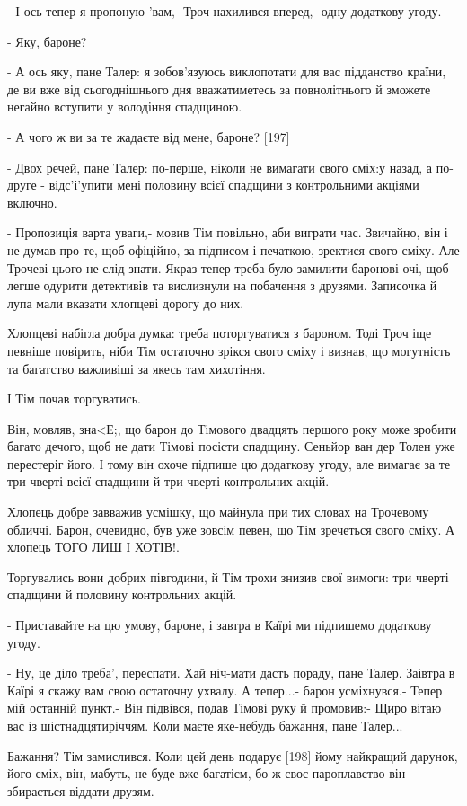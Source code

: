 - І ось тепер я пропоную 'вам,- Троч нахилився вперед,- одну додаткову угоду.

- Яку, бароне?

- А ось яку, пане Талер: я зобов'язуюсь виклопотати для вас підданство країни, де ви вже від сьогоднішнього дня вважатиметесь за повнолітнього й зможете негайно вступити у володіння спадщиною.

- А чого ж ви за те жадаєте від мене, бароне? [197]

- Двох речей, пане Талер: по-перше, ніколи не вимагати свого сміх:у назад, а по-друге - відс'і'упити мені половину всієї спадщини з контрольними акціями включно.

- Пропозиція варта уваги,- мовив Тім повільно, аби виграти час. Звичайно, він і не думав про те, щоб офіційно, за підписом і печаткою, зректися свого сміху. Але Трочеві цього не слід знати. Якраз тепер треба було замилити баронові очі, щоб легше одурити детективів та вислизнули на побачення з друзями. Записочка й лупа мали вказати хлопцеві дорогу до них.

Хлопцеві набігла добра думка: треба поторгуватися з бароном. Тоді Троч іще певніше повірить, ніби Тім остаточно зрікся свого сміху і визнав, що могутність та багатство важливіші за якесь там хихотіння.

І Тім почав торгуватись.

Він, мовляв, зна<Е;, що барон до Тімового двадцять першого року може зробити багато дечого, щоб не дати Тімові посісти спадщину. Сеньйор ван дер Толен уже перестеріг його. І тому він охоче підпише цю додаткову угоду, але вимагає за те три чверті всієї спадщини й три чверті контрольних акцій.

Хлопець добре завважив усмішку, що майнула при тих словах на Трочевому обличчі. Барон, очевидно, був уже зовсім певен, що Тім зречеться свого сміху. А хлопець ТОГО ЛИШ І ХОТІВ!.

Торгувались вони добрих півгодини, й Тім трохи знизив свої вимоги: три чверті спадщини й половину контрольних акцій.

- Приставайте на цю умову, бароне, і завтра в Каїрі ми підпишемо додаткову угоду.

- Ну, це діло треба', переспати. Хай ніч-мати дасть пораду, пане Талер. Заівтра в Каїрі я скажу вам свою остаточну ухвалу. А тепер...- барон усміхнувся.- Тепер мій останній пункт.- Він підвівся, подав Тімові руку й промовив:- Щиро вітаю вас із шістнадцятиріччям. Коли маєте яке-небудь бажання, пане Талер...

Бажання? Тім замислився. Коли цей день подарує [198] йому найкращий дарунок, його сміх, він, мабуть, не буде вже багатієм, бо ж своє пароплавство він збирається віддати друзям.

